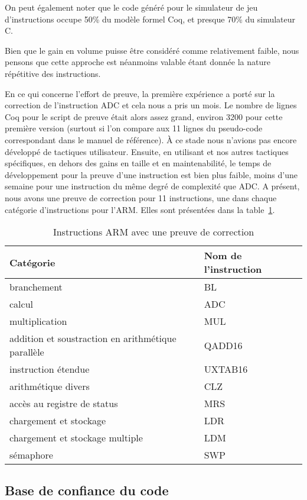 On peut également noter que le code généré pour le simulateur de
jeu d'instructions occupe 50\:\% du modèle formel Coq,
et presque 70\:\% du simulateur C.

Bien que le gain en volume puisse être considéré comme relativement faible,
nous pensons que cette approche est néanmoins valable
étant donnée la nature répétitive des instructions.

En ce qui concerne l'effort de preuve,
la première expérience a porté sur la correction de l'instruction ADC
et cela nous a pris un mois.
Le nombre de lignes Coq pour le script de preuve était alors
assez grand, environ 3200 pour cette première version
(surtout si l'on compare aux 11 lignes du pseudo-code correspondant
dans le manuel de référence).
À ce stade nous n'avions pas encore développé de tactiques utilisateur.
Ensuite, en utilisant \hcinv et nos autres tactiques spécifiques,
en dehors des gains en taille et en maintenabilité,
le temps de développement pour la preuve d'une instruction est bien plus
faible,
moins d'une semaine pour une instruction du même degré de complexité que ADC.
A présent, nous avons une preuve de correction pour 11 instructions,
une dans chaque catégorie d'instructions pour l'ARM.
Elles sont présentées dans la table~\ref{tab:prvinstfr}.

\begin{table}[ht]
  \centering
  \begin{tabular}{|l|l|}
    \hline
    Catégorie & Nom de l'instruction \\
    \hline
    branchement & BL \\
    calcul & ADC \\
    multiplication & MUL \\
    addition et soustraction en arithmétique parallèle  & QADD16 \\
    instruction étendue & UXTAB16 \\
    arithmétique divers & CLZ \\
    accès au registre de status  & MRS \\
    chargement et stockage & LDR \\
    chargement et stockage multiple & LDM \\
    sémaphore & SWP \\
    \hline
  \end{tabular}
  \smallskip
  \caption{Instructions ARM avec une preuve de correction}
  \label{tab:prvinstfr}
\end{table}

\subsection*{Base de confiance du code}


